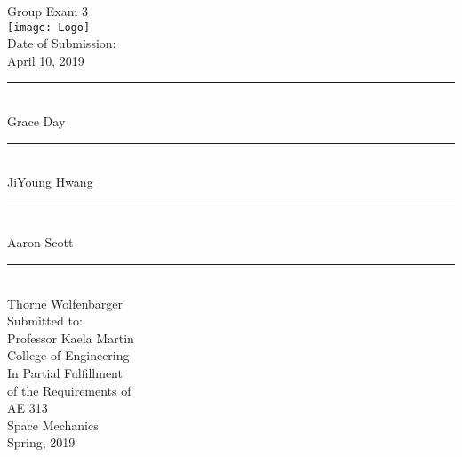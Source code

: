 

\begin{center}
  {\huge Group Exam 3}\\
  \vspace{10px}
  \texttt{[image: Logo]} \\
  Date of Submission:\\
  April 10, 2019\\
  \vspace{30px}
  \rule{300px}{0.5px} \\
  Grace Day\\
  \vspace{30px}
  \rule{300px}{0.5px} \\
  JiYoung Hwang\\
  \vspace{30px}
  \rule{300px}{0.5px} \\
  Aaron Scott\\
  \vspace{30px}
  \rule{300px}{0.5px} \\
  Thorne Wolfenbarger\\
  \vspace{30px}
  Submitted to: \\
  Professor Kaela Martin \\
  College of Engineering \\
  \vspace{40px}
  In Partial Fulfillment \\
  of the Requirements of \\
  \vspace{10px}
  AE 313 \\
  Space Mechanics \\
  Spring, 2019 \\
\end{center}
